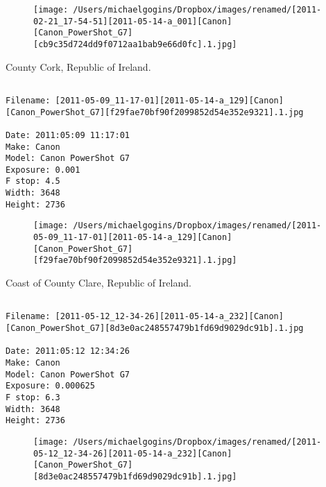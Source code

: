 \begin{figure}
\texttt{[image: /Users/michaelgogins/Dropbox/images/renamed/[2011-02-21\_17-54-51][2011-05-14-a\_001][Canon][Canon\_PowerShot\_G7][cb9c35d724dd9f0712aa1bab9e66d0fc].1.jpg]}
\end{figure}
    
\clearpage
\onecolumn
\noindent County Cork, Republic of Ireland.
\noindent
\begin{lstlisting}

Filename: [2011-05-09_11-17-01][2011-05-14-a_129][Canon][Canon_PowerShot_G7][f29fae70bf90f2099852d54e352e9321].1.jpg

Date: 2011:05:09 11:17:01
Make: Canon
Model: Canon PowerShot G7
Exposure: 0.001
F stop: 4.5
Width: 3648
Height: 2736
\end{lstlisting}
\clearpage

\begin{figure}
\texttt{[image: /Users/michaelgogins/Dropbox/images/renamed/[2011-05-09\_11-17-01][2011-05-14-a\_129][Canon][Canon\_PowerShot\_G7][f29fae70bf90f2099852d54e352e9321].1.jpg]}
\end{figure}
    
\clearpage
\onecolumn
\noindent Coast of County Clare, Republic of Ireland.
\noindent
\begin{lstlisting}

Filename: [2011-05-12_12-34-26][2011-05-14-a_232][Canon][Canon_PowerShot_G7][8d3e0ac248557479b1fd69d9029dc91b].1.jpg

Date: 2011:05:12 12:34:26
Make: Canon
Model: Canon PowerShot G7
Exposure: 0.000625
F stop: 6.3
Width: 3648
Height: 2736
\end{lstlisting}
\clearpage

\begin{figure}
\texttt{[image: /Users/michaelgogins/Dropbox/images/renamed/[2011-05-12\_12-34-26][2011-05-14-a\_232][Canon][Canon\_PowerShot\_G7][8d3e0ac248557479b1fd69d9029dc91b].1.jpg]}
\end{figure}
    
